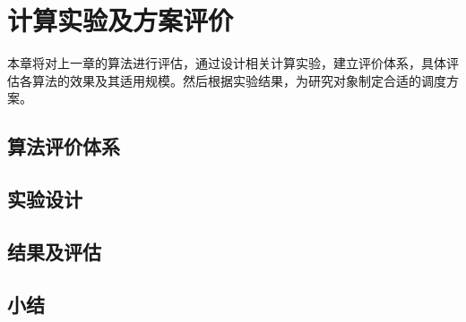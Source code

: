 \chapter{计算实验及方案评价}
本章将对上一章的算法进行评估，通过设计相关计算实验，建立评价体系，具体评估各算法的效果及其适用规模。然后根据实验结果，为研究对象制定合适的调度方案。
\section{算法评价体系}

\section{实验设计}


\section{结果及评估}


\section{小结}